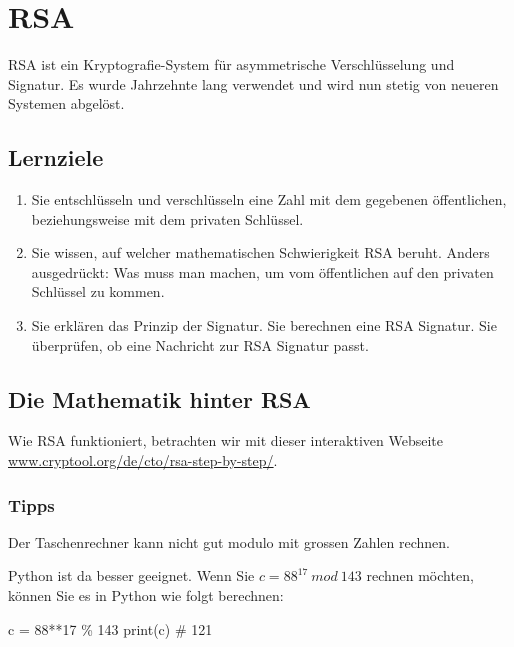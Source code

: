 \documentclass[
  nswissgerman,
  a4paper,
  DIV=11,
  numbers=noendperiod,
  ngerman]{scrreprt}
\newenvironment{Shaded}{\begin{snugshade}}{\end{snugshade}}
\newcommand{\BuiltInTok}[1]{\textcolor[rgb]{0.00,0.23,0.31}{#1}}
\newcommand{\CommentTok}[1]{\textcolor[rgb]{0.37,0.37,0.37}{#1}}
\newcommand{\DecValTok}[1]{\textcolor[rgb]{0.68,0.00,0.00}{#1}}
\newcommand{\NormalTok}[1]{\textcolor[rgb]{0.00,0.23,0.31}{#1}}
\newcommand{\OperatorTok}[1]{\textcolor[rgb]{0.37,0.37,0.37}{#1}}
\providecommand{\tightlist}{%
  \setlength{\itemsep}{0pt}\setlength{\parskip}{0pt}}
\begin{document}
\chapter{RSA}\label{rsa}

RSA ist ein Kryptografie-System für asymmetrische Verschlüsselung und
Signatur. Es wurde Jahrzehnte lang verwendet und wird nun stetig von
neueren Systemen abgelöst.

\section{Lernziele}\label{lernziele-2}

\begin{enumerate}
\def\labelenumi{\arabic{enumi}.}
\tightlist
\item
  Sie entschlüsseln und verschlüsseln eine Zahl mit dem gegebenen
  öffentlichen, beziehungsweise mit dem privaten Schlüssel.
\item
  Sie wissen, auf welcher mathematischen Schwierigkeit RSA beruht.
  Anders ausgedrückt: Was muss man machen, um vom öffentlichen auf den
  privaten Schlüssel zu kommen.
\item
  Sie erklären das Prinzip der Signatur. Sie berechnen eine RSA
  Signatur. Sie überprüfen, ob eine Nachricht zur RSA Signatur passt.
\end{enumerate}

\section{Die Mathematik hinter RSA}\label{die-mathematik-hinter-rsa}

Wie RSA funktioniert, betrachten wir mit dieser interaktiven Webseite
\href{https://www.cryptool.org/de/cto/rsa-step-by-step/}{www.cryptool.org/de/cto/rsa-step-by-step/}.

\subsection{Tipps}\label{tipps}

Der Taschenrechner kann nicht gut modulo mit grossen Zahlen rechnen.

Python ist da besser geeignet. Wenn Sie \(c=88^{17} ~mod~ 143\) rechnen
möchten, können Sie es in Python wie folgt berechnen:

\begin{Shaded}
\begin{Highlighting}[numbers=left,,]
\NormalTok{c }\OperatorTok{=} \DecValTok{88}\OperatorTok{**}\DecValTok{17} \OperatorTok{\%} \DecValTok{143}
\BuiltInTok{print}\NormalTok{(c)}
\CommentTok{\# 121}
\end{Highlighting}
\end{Shaded}
\end{document}
